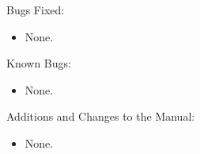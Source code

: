 \noindent Bugs Fixed:

\begin{itemize}

\item None.

\end{itemize}

\noindent Known Bugs:

\begin{itemize}

\item None.

\end{itemize}

\noindent Additions and Changes to the Manual:

\begin{itemize}

\item None.

\end{itemize}


